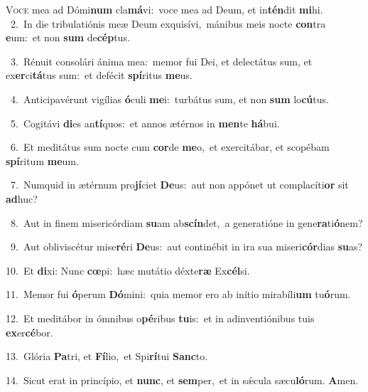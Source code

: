 \lettrine{\initial\textcolor{\initialcolor}{V}}{oce} mea ad Dómi\textbf{num} cla\-\textbf{má}\-vi:~\star voce mea ad Deum, et in\-\textbf{tén}\-dit \textbf{mi}\-hi.\\
{\numbfont\textcolor{\numbcolor}{~2.}}~In die tribulatiónis meæ Deum exquisívi,~\dagger mánibus meis nocte \textbf{con}\-tra \textbf{e}\-um:~\star et non \textbf{sum} de\-\textbf{cép}\-tus.\par
{\numbfont\textcolor{\numbcolor}{~3.}}~Rénuit consolári ánima mea:~\dagger memor fui Dei, et delectátus sum, et ex\-\textbf{er}\-ci\-\textbf{tá}\-tus sum:~\star et defécit \textbf{spí}\-ritus \textbf{me}\-us.\par
{\numbfont\textcolor{\numbcolor}{~4.}}~Anticipavérunt vigílias \textbf{ó}\-culi \textbf{me}\-i:~\star turbátus sum, et non \textbf{sum} lo\-\textbf{cú}\-tus.\par
{\numbfont\textcolor{\numbcolor}{~5.}}~Cogitávi \textbf{di}\-es an\-\textbf{tí}\-quos:~\star et annos ætérnos in \textbf{men}\-te \textbf{há}\-bui.\par
{\numbfont\textcolor{\numbcolor}{~6.}}~Et meditátus sum nocte cum \textbf{cor}\-de \textbf{me}\-o,~\star et exercitábar, et scopébam \textbf{spí}\-ritum \textbf{me}\-um.\par
{\numbfont\textcolor{\numbcolor}{~7.}}~Numquid in ætérnum pro\-\textbf{jí}\-ciet \textbf{De}\-us:~\star aut non appónet ut complacíti\textbf{or} sit \textbf{ad}\-huc?\par
{\numbfont\textcolor{\numbcolor}{~8.}}~Aut in finem misericórdiam \textbf{su}\-am ab\-\textbf{scín}\-det,~\star a generatióne in gene\-\textbf{ra}\-ti\-\textbf{ó}\-nem?\par
{\numbfont\textcolor{\numbcolor}{~9.}}~Aut obliviscétur mise\-\textbf{ré}\-ri \textbf{De}\-us:~\star aut continébit in ira sua miseri\-\textbf{cór}\-dias \textbf{su}\-as?\par
{\numbfont\textcolor{\numbcolor}{10.}}~Et \textbf{di}\-xi: Nunc \textbf{cœ}\-pi:~\star hæc mutátio déxte\textbf{ræ} Ex\-\textbf{cél}\-si.\par
{\numbfont\textcolor{\numbcolor}{11.}}~Memor fui \textbf{ó}\-perum \textbf{Dó}\-mini:~\star quia memor ero ab inítio mirabíli\textbf{um} tu\-\textbf{ó}\-rum.\par
{\numbfont\textcolor{\numbcolor}{12.}}~Et meditábor in ómnibus o\-\textbf{pé}\-ribus \textbf{tu}\-is:~\star et in adinventiónibus tuis \textbf{ex}\-er\-\textbf{cé}\-bor.\par
{\numbfont\textcolor{\numbcolor}{13.}}~Glória \textbf{Pa}\-tri, et \textbf{Fí}\-lio,~\star et Spi\-\textbf{rí}\-tui \textbf{Sanc}\-to.\par
{\numbfont\textcolor{\numbcolor}{14.}}~Sicut erat in princípio, et \textbf{nunc}\-, et \textbf{sem}\-per,~\star et in sǽcula sæcu\-\textbf{ló}\-rum. \textbf{A}\-men.\par
